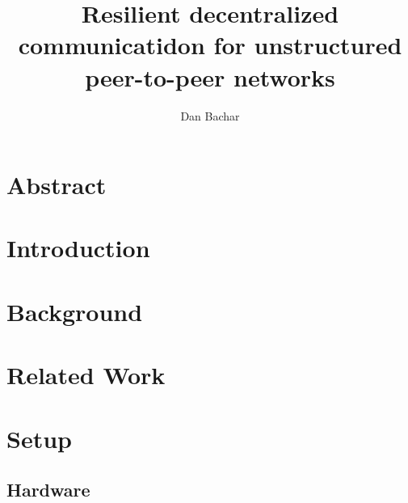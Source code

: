 \documentclass[sigconf,nonacm]{acmart}
\begin{document}
\title{Resilient decentralized communicatidon for unstructured peer-to-peer networks}

\author{Dan Bachar}



\maketitle

\section*{Abstract}

\label{sec:abstract}

\section{Introduction}

\label{sec:introduction}

\section{Background}

\label{sec:background}

\section{Related Work}

\label{sec:related}

\section{Setup}
\subsection{Hardware}

\label{sec:hardware_setup}
\end{document}
